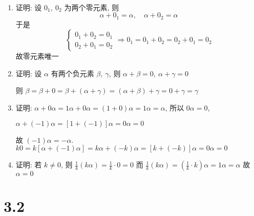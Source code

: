 	 \paragraph{} %
		 \begin{enumerate}
			 \item %
			       证明: 设 \(0_{1},\ 0_{2}\) 为两个零元素, 则
			       \[
				       \alpha + 0_{1} = \alpha,\quad \alpha + 0_{2} = \alpha
			       \]
			       于是
			       \[
				       \begin{cases}
					       0_{1} + 0_{2} = 0_{1} \\
					       0_{2} + 0_{1} = 0_{2}
				       \end{cases}
				       \Rightarrow 0_{1} = 0_{1} + 0_{2} = 0_{2} + 0_{1} = 0_{2}
			       \]
			       故零元素唯一
			 \item %
			       证明: 设 \(\alpha\) 有两个负元素 \(\beta,\ \gamma\), 则 \(\alpha + \beta = 0,\ \alpha + \gamma = 0\)

			       则 \(\beta = \beta + 0 = \beta + (\alpha + \gamma) = (\alpha + \beta) + \gamma = 0 + \gamma = \gamma\)

			 \item %
			       证明: \(\alpha + 0\alpha = 1\alpha + 0\alpha = (1 + 0)\alpha = 1\alpha = \alpha\), 所以 \(0\alpha = 0\),

			       \(
			       \alpha + (-1)\alpha = [1 + (-1)]\alpha = 0\alpha = 0
			       \)

			       故 \((-1)\alpha = -\alpha\). \(k0 = k[\alpha + (-1)\alpha] = k\alpha + (-k)\alpha = [k + (-k)]\alpha = 0\alpha = 0\)

			 \item %
			       证明: 若 \(k \neq 0\), 则 \(\frac{1}{k}(k\alpha) = \frac{1}{k} \cdot 0 = 0\) 而 \(\frac{1}{k}(k\alpha) = (\frac{1}{k} \cdot k)\alpha = 1\alpha = \alpha\)
			       故 \(\alpha = 0\)
		 \end{enumerate}


\section{3.2}
 \subsection{} %

